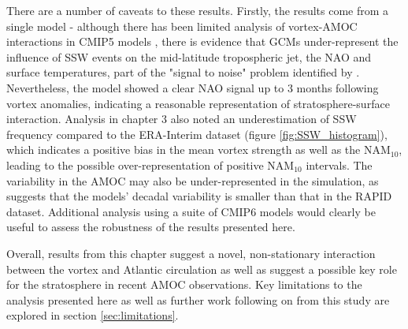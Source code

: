 There are a number of caveats to these results. Firstly, the results come from a single model - although there has been limited analysis of vortex-AMOC interactions in CMIP5 models \citep{reichlerStratospheric2012b}, there is evidence that GCMs under-represent the influence of SSW events on the mid-latitude tropospheric jet, the NAO and surface temperatures, part of the "signal to noise" problem identified by \cite{scaifeSignaltonoise2018b}. Nevertheless, the model showed a clear NAO signal up to 3 months following vortex anomalies, indicating a reasonable representation of stratosphere-surface interaction. Analysis in chapter 3 also noted an underestimation of SSW frequency compared to the ERA-Interim dataset (figure \ref{fig:SSW_histogram}), which indicates a positive bias in the mean vortex strength as well as the NAM$_{10}$, leading to the possible over-representation of positive NAM$_{10}$ intervals. The variability in the AMOC may also be under-represented in the simulation, as \cite{roberts20042014} suggests that the  models' decadal variability is smaller than that in the RAPID dataset. Additional analysis using a suite of CMIP6 models would clearly be useful to assess the robustness of the results presented here. 

Overall, results from this chapter suggest a novel, non-stationary interaction between the vortex and Atlantic circulation as well as suggest a possible key role for the stratosphere in recent AMOC observations. Key limitations to the analysis presented here as well as further work following on from this study are explored in section \ref{sec:limitations}.






